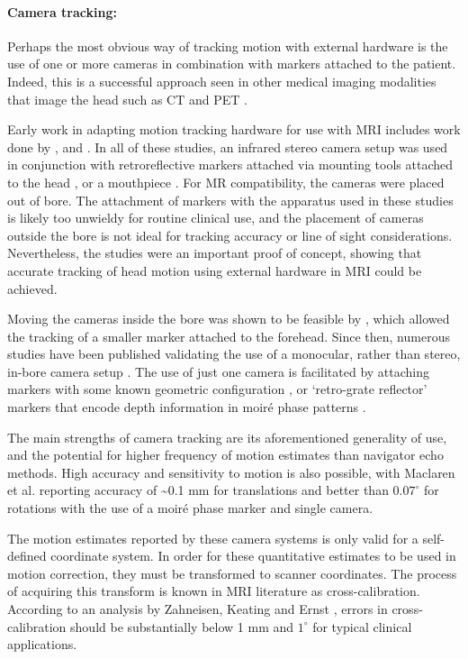 \documentclass[class=article, crop=false]{standalone}
\begin{document}
\paragraph{Camera tracking:}
Perhaps the most obvious way of tracking motion with external hardware is the use of one or more cameras in combination with markers attached to the patient. Indeed, this is a successful approach seen in other medical imaging modalities that image the head such as CT \parencite{Kim2015,Kim2016} and PET \parencite{Bloomfield2003,Fulton2002}.
\par 
Early work in adapting motion tracking hardware for use with MRI includes work done by \cite{Tremblay2005a}, \cite{Zaitsev2006a} and \cite{Dold2006}. In all of these studies, an infrared stereo camera setup was used in conjunction with retroreflective markers attached via mounting tools attached to the head \parencite{Tremblay2005a}, or a mouthpiece \parencite{Zaitsev2006a,Dold2006}. For MR compatibility, the cameras were placed out of bore. The attachment of markers with the apparatus used in these studies is likely too unwieldy for routine clinical use, and the placement of cameras outside the bore is not ideal for tracking accuracy or line of sight considerations. Nevertheless, the studies were an important proof of concept, showing that accurate tracking of head motion using external hardware in MRI could be achieved.
\par
Moving the cameras inside the bore was shown to be feasible by \cite{Qin2009}, which allowed the tracking of a smaller marker attached to the forehead. Since then, numerous studies have been published validating the use of a monocular, rather than stereo, in-bore camera setup \parencite{Aksoy2011,Aksoy2017,Forman2011,Maclaren2012,Andrews-Shigaki2011,MacLaren2011,Gumus2015a}. The use of just one camera is facilitated by attaching markers with some known geometric configuration \parencite{Forman2011}, or `retro-grate reflector' markers that encode depth information in moiré phase patterns \parencite{Andrews-Shigaki2011}.
\par
The main strengths of camera tracking are its aforementioned generality of use, and the potential for higher frequency of motion estimates than navigator echo methods. High accuracy and sensitivity to motion is also possible, with Maclaren et al. \parencite*{Maclaren2012} reporting accuracy of \~{}0.1 mm for translations and better than $0.07^{\circ}$ for rotations with the use of a moiré phase marker and single camera.
\par
The motion estimates reported by these camera systems is only valid for a self-defined coordinate system. In order for these quantitative estimates to be used in motion correction, they must be transformed to scanner coordinates. The process of acquiring this transform is known in MRI literature as cross-calibration. According to an analysis by Zahneisen, Keating and Ernst \parencite*{Zahneisen2014a}, errors in cross-calibration should be substantially below 1 mm and $1^{\circ}$ for typical clinical applications. 
\end{document}
